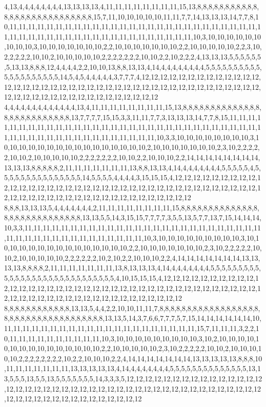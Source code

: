 4,13,4,4,4,4,4,4,4,4,13,13,13,13,4,11,11,11,11,11,11,11,11,15,13,8,8,8,8,8,8,8,8,8,8,8,8,8,8,8,8,8,8,8,8,8,8,8,8,8,8,8,15,7,11,10,10,10,10,10,11,11,7,7,14,13,13,13,14,7,7,8,10,11,11,11,11,11,11,11,11,11,11,11,11,11,11,11,11,11,11,11,11,11,11,11,11,11,11,11,11,11,11,11,11,11,11,11,11,11,11,11,11,11,11,11,11,11,11,11,11,10,3,10,10,10,10,10,10,10,10,10,3,10,10,10,10,10,10,10,2,2,10,10,10,10,10,10,10,2,2,10,10,10,10,10,2,2,3,10,2,2,2,2,2,10,10,2,10,10,10,10,10,2,2,2,2,2,2,2,10,10,2,2,10,2,2,2,4,13,13,13,5,5,5,5,5,5,5,13,13,8,8,8,12,4,4,4,4,2,2,10,10,13,8,8,13,13,4,14,4,4,4,4,4,4,4,4,5,5,5,5,5,5,5,5,5,5,5,5,5,5,5,5,5,5,5,5,14,5,4,5,4,4,4,4,4,3,7,7,7,4,12,12,12,12,12,12,12,12,12,12,12,12,12,12,12,12,12,12,12,12,12,12,12,12,12,12,12,12,12,12,12,12,12,12,12,12,12,12,12,12,12,12,12,12,12,12,12,12,12,12,12,12,12,12,12,12,12,12
4,4,4,4,4,4,4,4,4,4,4,4,4,13,4,11,11,11,11,11,11,11,11,15,13,8,8,8,8,8,8,8,8,8,8,8,8,8,8,8,8,8,8,8,8,8,8,8,8,8,8,13,7,7,7,7,15,15,3,3,11,11,7,7,3,13,13,13,14,7,7,8,15,11,11,11,11,11,11,11,11,11,11,11,11,11,11,11,11,11,11,11,11,11,11,11,11,11,11,11,11,11,11,11,11,11,11,11,11,11,11,11,11,11,11,11,11,11,11,11,11,10,3,3,10,10,10,10,10,10,10,10,3,10,10,10,10,10,10,10,10,10,10,10,10,10,10,10,10,2,10,10,10,10,10,10,10,2,3,10,2,2,2,2,2,10,10,2,10,10,10,10,10,2,2,2,2,2,2,2,10,10,2,2,10,10,10,2,2,14,14,14,14,14,14,14,14,13,13,13,8,8,8,8,8,2,11,11,11,11,11,11,11,13,8,8,13,13,4,14,4,4,4,4,4,4,4,5,5,5,5,5,4,5,5,5,5,5,5,5,5,5,5,5,5,5,5,5,14,5,5,5,5,4,4,4,4,3,15,15,15,4,12,12,12,12,12,12,12,12,12,12,12,12,12,12,12,12,12,12,12,12,12,12,12,12,12,12,12,12,12,12,12,12,12,12,12,12,12,12,12,12,12,12,12,12,12,12,12,12,12,12,12,12,12,12,12,12,12,12
8,8,8,13,13,13,5,4,4,4,4,4,4,4,2,11,11,11,11,11,11,11,11,15,8,8,8,8,8,8,8,8,8,8,8,8,8,8,8,8,8,8,8,8,8,8,8,8,8,8,8,8,13,13,5,5,14,3,15,15,7,7,7,7,3,5,5,13,5,7,7,13,7,15,14,14,14,10,3,3,11,11,11,11,11,11,11,11,11,11,11,11,11,11,11,11,11,11,11,11,11,11,11,11,11,11,11,11,11,11,11,11,11,11,11,11,11,11,11,11,11,10,3,10,10,10,10,10,10,10,10,10,3,10,10,10,10,10,10,10,10,10,10,10,10,10,10,10,2,2,10,10,10,10,10,10,10,2,3,10,2,2,2,2,2,10,10,2,10,10,10,10,10,2,2,2,2,2,2,10,2,10,2,2,10,10,10,2,2,4,14,14,14,14,14,14,14,13,13,13,13,8,8,8,8,2,11,11,11,11,11,11,11,13,8,13,13,13,4,14,4,4,4,4,4,4,4,5,5,5,5,5,5,5,5,5,5,5,5,5,5,5,5,5,5,5,5,5,5,5,5,5,5,5,5,5,4,10,15,15,15,4,12,12,12,12,12,12,12,12,12,12,12,12,12,12,12,12,12,12,12,12,12,12,12,12,12,12,12,12,12,12,12,12,12,12,12,12,12,12,12,12,12,12,12,12,12,12,12,12,12,12,12,12,12,12,12,12,12,12
8,8,8,8,8,8,8,8,8,8,8,8,13,13,5,4,4,2,2,10,10,11,11,7,8,8,8,8,8,8,8,8,8,8,8,8,8,8,8,8,8,8,8,8,8,8,8,8,8,8,8,8,8,8,8,8,8,8,8,8,13,13,5,14,3,7,6,6,7,7,7,5,7,15,14,14,14,14,14,14,10,11,11,11,11,11,11,11,11,11,11,11,11,11,11,11,11,11,11,11,11,11,15,7,11,11,11,3,2,2,10,11,11,11,11,11,11,11,11,11,11,10,3,10,10,10,10,10,10,10,10,10,3,10,2,10,10,10,10,10,10,10,10,10,10,10,10,10,10,10,2,2,10,10,10,10,10,2,3,10,2,2,2,2,2,10,10,2,10,10,10,10,10,2,2,2,2,2,2,2,2,10,2,2,10,10,10,2,2,4,14,14,14,14,14,14,14,13,13,13,13,13,8,8,8,10,11,11,11,11,11,11,11,13,13,13,13,13,4,14,4,4,4,4,4,4,4,5,5,5,5,5,5,5,5,5,5,5,5,5,5,13,13,5,5,5,13,5,5,13,5,5,5,5,5,5,5,14,3,3,3,5,12,12,12,12,12,12,12,12,12,12,12,12,12,12,12,12,12,12,12,12,12,12,12,12,12,12,12,12,12,12,12,12,12,12,12,12,12,12,12,12,12,12,12,12,12,12,12,12,12,12,12,12,12,12,12,12,12,12
